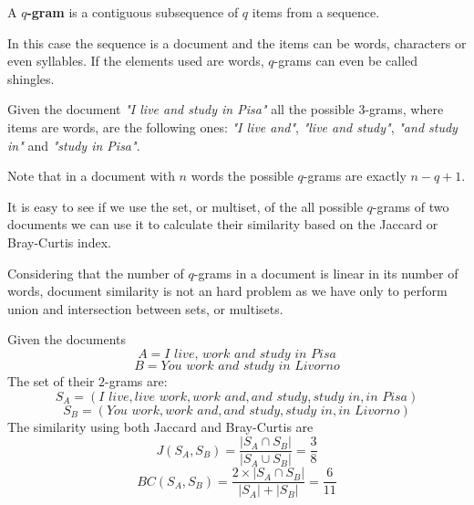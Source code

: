 \begin{definizione}
	A \textbf{$q$-gram} is a contiguous subsequence of $q$ items from a sequence.
\end{definizione}

In this case the sequence is a document and the items can be words, characters or even syllables. If the elements used are words, $q$-grams can even be called shingles.\medskip

\begin{esempio}
	Given the document \textit{"I live and study in Pisa"} all the possible $3$-grams, where items are words, are the following ones:
	\textit{"I live and"}, \textit{"live and study"}, \textit{"and study in"} and \textit{"study in Pisa"}.
\end{esempio}

Note that in a document with $n$ words the possible $q$-grams are exactly $n-q+1$.\medskip

It is easy to see if we use the set, or multiset, of the all possible $q$-grams of two documents we can use it to calculate their similarity based on the Jaccard or Bray-Curtis index.\medskip

Considering that the number of $q$-grams in a document is linear in its number of words, document similarity is not an hard problem as we have only to perform union and intersection between sets, or multisets.\medskip

\begin{esempio}
	Given the documents 
	\begin{equation*}
	A = \textit{I live, work and study in Pisa}
	\end{equation*}
	\begin{equation*}
	B = \textit{You work and study in Livorno}
	\end{equation*}
	The set of their $2$-grams are:
	\begin{equation*}
	S_{A} = (\textit{I live}, \textit{live work}, \textit{work and}, \textit{and study}, \textit{study in}, \textit{in Pisa})
	\end{equation*}
	\begin{equation*}
	S_{B} = (\textit{You work}, \textit{work and}, \textit{and study}, \textit{study in}, \textit{in Livorno})
	\end{equation*}
	The similarity using both Jaccard and Bray-Curtis are\medskip
	\begin{equation*}
	J(S_{A},S_{B}) = \frac{|S_{A} \cap S_{B} |}{|S_{A} \cup S_{B} |} = \frac{3}{8}
	\end{equation*}
	\begin{equation*}
	BC(S_{A},S_{B}) = \frac{2 \times |S_{A} \cap S_{B} |}{|S_{A}| +|S_{B}|} = \frac{6}{11}
	\end{equation*}
\end{esempio}


